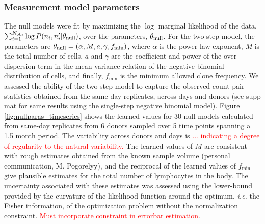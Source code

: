 \documentclass[letterpaper,english,prl,reprint,longbibliography]{revtex4-1} %
\newcommand{\re}[1]{\textcolor{red}{#1}}
\begin{document}
\subsubsection*{Measurement model parameters}
The null models were fit by maximizing the $\log$ marginal likelihood of the data, $\sum_{i=1}^{N_{\textrm{\textrm{obs}}}} \log P(n_i,n'_i|\theta_{\text{\textrm{null}}})$, over the parameters, $\theta_{\text{\textrm{null}}}$. 
For the two-step model, the parameters are $\theta_{\text{\textrm{null}}}=(\alpha,M,a,\gamma,f_{\textrm{min}})$, where $\alpha$ is the power law exponent, $M$ is the total number of cells, $a$ and $\gamma$ are the coefficient and power of the over-dispersion term in the mean variance relation of the negative binomial distribution of cells, and finally, $f_{\textrm{min}}$ is the minimum allowed clone frequency.
We assessed the ability of the two-step model to capture the observed count pair statistics obtained from the same-day replicates, across days and donors (see supp mat for same results using the single-step negative binomial model). 
Figure \ref{fig:nullparas_timeseries} shows the learned values for 30 null models calculated from same-day replicates from 6 donors sampled over 5 time points spanning a 1.5 month period. 
The variability across donors and days is \textcolor{red}{... indicating a degree of regularity to the natural variability.} 
The learned values of $M$ are consistent with rough estimates obtained from the known sample volume (personal communication, M. Pogorelyy), and the reciprocal of the learned values of $f_{\textrm{min}}$ give plausible estimates for the total number of lymphocytes in the body.
The uncertainty associated with these estimates was assessed using the lower-bound provided by the curvature of the likelihood function around the optimum, \emph{i.e.} the Fisher information, of the optimization problem without the normalization constraint. \re{Must incorporate constraint in errorbar estimation}.
\end{document}
